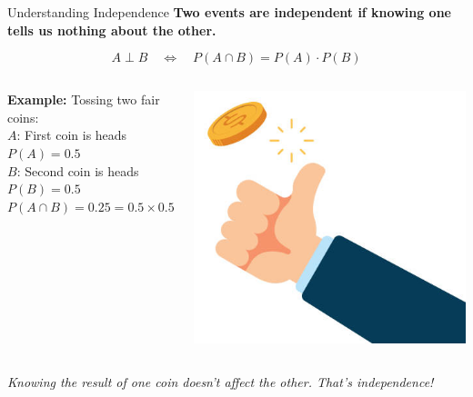 \documentclass[handout,aspectratio=169]{beamer}
\begin{document}
\begin{frame}{Understanding Independence}
  \textbf{Two events are independent if knowing one tells us nothing about the other.}

  \vspace{1em}
  \[
    A \perp B \quad \Leftrightarrow \quad P(A \cap B) = P(A) \cdot P(B)
  \]

  \vspace{1em}
  \begin{columns}
\textbf{Example:} Tossing two fair coins:\\
  \quad $A$: First coin is heads \quad $P(A) = 0.5$\\
  \quad $B$: Second coin is heads \quad $P(B) = 0.5$\\
  \quad $P(A \cap B) = 0.25 = 0.5 \times 0.5$
  
    \includegraphics[width=0.6\linewidth]{figs/toss.png}
\end{columns}
  

  \vspace{1em}
  \textit{Knowing the result of one coin doesn’t affect the other. That’s independence!}
\end{frame}
\end{document}
